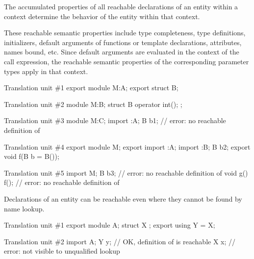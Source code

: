 \pnum
The accumulated properties of all reachable declarations of
an entity within a context
determine the behavior of the entity within that context.
\begin{note}
These reachable semantic properties include type completeness,
type definitions, initializers,
default arguments of functions or template declarations, attributes,
names bound, etc.
Since default arguments are evaluated in the context of the call expression,
the reachable semantic properties of the corresponding parameter types apply in
that context.
\begin{example}
\begin{codeblocktu}{Translation unit \#1}
export module M:A;
export struct B;
\end{codeblocktu}

\begin{codeblocktu}{Translation unit \#2}
module M:B;
struct B {
  operator int();
};
\end{codeblocktu}

\begin{codeblocktu}{Translation unit \#3}
module M:C;
import :A;
B b1;                           // error: no reachable definition of 
\end{codeblocktu}

\begin{codeblocktu}{Translation unit \#4}
export module M;
export import :A;
import :B;
B b2;
export void f(B b = B());
\end{codeblocktu}

\begin{codeblocktu}{Translation unit \#5}
import M;
B b3;                           // error: no reachable definition of 
void g() { f(); }               // error: no reachable definition of 
\end{codeblocktu}
\end{example}
\end{note}

\pnum
\begin{note}
Declarations of an entity can be reachable
even where they cannot be found by name lookup.
\end{note}
\begin{example}
\begin{codeblocktu}{Translation unit \#1}
export module A;
struct X {};
export using Y = X;
\end{codeblocktu}

\begin{codeblocktu}{Translation unit \#2}
import A;
Y y;                // OK, definition of  is reachable
X x;                // error:  not visible to unqualified lookup
\end{codeblocktu}
\end{example}
